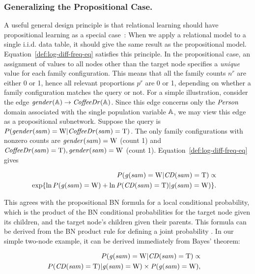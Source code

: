 \documentclass[runningheads,a4paper]{llncs}
\newcommand{\iid}{i.i.d.}
\begin{document}
\subsubsection{Generalizing the Propositional Case.} A useful general design principle is that relational learning should have propositional learning as a special case~\cite{Ch.10deraedt,Knobbe2006}: When we apply a relational model to a single \iid{} data table, it should give the same result as the propositional model. Equation~\ref{def:log-diff-freq-eq} satisfies this principle. In the propositional case, an assignment of values to all nodes other than the target node specifies a {\em unique} value for each family configuration. This means that all the family counts $n^{r}$ are either 0 or 1, hence all relevant proportions $p^{r}$ are 0 or 1, depending on whether a family configuration matches the query or not. For a simple illustration, consider the edge $\it{gender}(\mathbb{A}) \rightarrow \it{CoffeeDr}(\mathbb{A})$. Since this edge concerns only the $\it{Person}$ domain associated with the single population variable $\mathbb{A}$, we may 
view this edge as a propositional subnetwork.
%
Suppose the query is $P(\it{gender}(sam)= \mathrm{W}|\it{CoffeeDr}(sam)=\mathrm{T})$. The only family configurations with nonzero counts are $\it{gender}(sam)= \mathrm{W}$ (count 1) and $\it{CoffeeDr}(sam)=\mathrm{T}),\it{gender}(sam)= \mathrm{W}$ (count 1). Equation~\eqref{def:log-diff-freq-eq} gives


\begin{eqnarray*}
P(\it{g}(sam)= \mathrm{W}|\it{CD}(sam)=\mathrm{T}) \propto \\
\exp \{\ln P(\it{g}(sam)= \mathrm{W}) + \ln P(\it{CD}(sam)=\mathrm{T})|\it{g}(sam)= \mathrm{W})\}.&&
\end{eqnarray*}


This agrees with the propositional BN formula for a local conditional probability, which is the product of the BN conditional probabilities for the target node given its children, and the target node's children given their parents. This formula can be derived from the BN product rule for defining a joint probability \cite[Ch.14.5.2]{Russell2010}. In our simple two-node example, it can be derived immediately from Bayes' theorem:

\begin{eqnarray*}
P(\it{g}(sam)= \mathrm{W}|\it{CD}(sam)=\mathrm{T}) \propto \\
P(\it{CD}(sam)=\mathrm{T})|\it{g}(sam)= \mathrm{W}) \times P(\it{g}(sam)= \mathrm{W}),&&
\end{eqnarray*}
\end{document}
